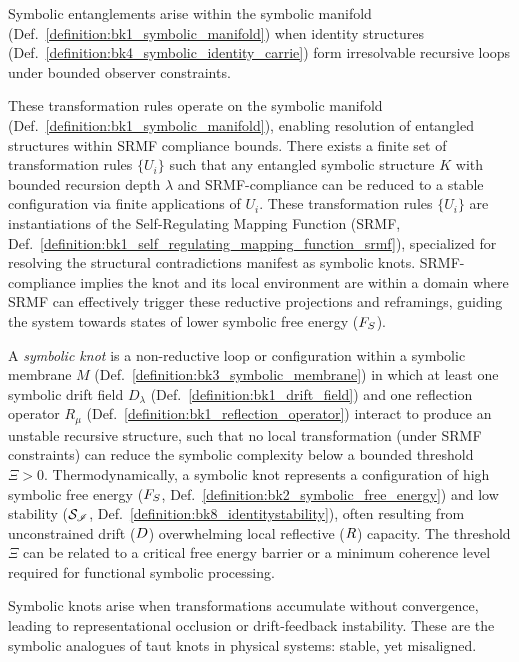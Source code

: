 Symbolic entanglements arise within the symbolic manifold (Def.~\ref{definition:bk1_symbolic_manifold}) when identity structures (Def.~\ref{definition:bk4_symbolic_identity_carrie}) form irresolvable recursive loops under bounded observer constraints.
\begin{axiom}
\label{axiom:bk8_symbolic_reidemeister_algebra}
These transformation rules operate on the symbolic manifold (Def.~\ref{definition:bk1_symbolic_manifold}), enabling resolution of entangled structures within SRMF compliance bounds.
There exists a finite set of transformation rules $\{U_i\}$ such that any entangled symbolic structure $K$ with bounded recursion depth $\lambda$ and SRMF-compliance can be reduced to a stable configuration via finite applications of $U_i$. These transformation rules $\{U_i\}$ are instantiations of the Self-Regulating Mapping Function (SRMF, Def.~\ref{definition:bk1_self_regulating_mapping_function_srmf}), specialized for resolving the structural contradictions manifest as symbolic knots. SRMF-compliance implies the knot and its local environment are within a domain where SRMF can effectively trigger these reductive projections and reframings, guiding the system towards states of lower symbolic free energy ($F_S$).
\end{axiom}
\begin{definition}
\label{definition:bk8_symbolic_adjacency}
A \emph{symbolic knot} is a non-reductive loop or configuration within a symbolic membrane \( M \) (Def.~\ref{definition:bk3_symbolic_membrane}) in which at least one symbolic drift field \( D_\lambda \) (Def.~\ref{definition:bk1_drift_field}) and one reflection operator \( R_\mu \) (Def.~\ref{definition:bk1_reflection_operator}) interact to produce an unstable recursive structure, such that no local transformation (under SRMF constraints) can reduce the symbolic complexity below a bounded threshold \( \Xi > 0 \).
Thermodynamically, a symbolic knot represents a configuration of high symbolic free energy ($F_S$, Def.~\ref{definition:bk2_symbolic_free_energy}) and low stability ($\mathcal{S}_{\mathscr{I}}$, Def.~\ref{definition:bk8_identitystability}), often resulting from unconstrained drift ($D$) overwhelming local reflective ($R$) capacity. The threshold $\Xi$ can be related to a critical free energy barrier or a minimum coherence level required for functional symbolic processing.
\end{definition}
Symbolic knots arise when transformations accumulate without convergence, leading to representational occlusion or drift-feedback instability. These are the symbolic analogues of taut knots in physical systems: stable, yet misaligned.
